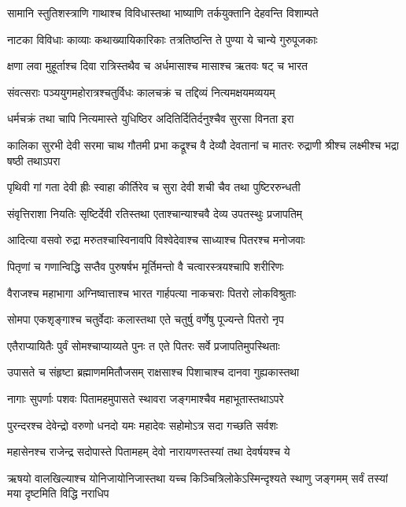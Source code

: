 \twolineshloka
{सामानि स्तुतिशस्त्राणि गाथाश्च विविधास्तथा}
{भाष्याणि तर्कयुक्तानि देहवन्ति विशाम्पते}


\twolineshloka
{नाटका विविधाः काव्याः कथाख्यायिकारिकाः}
{तत्रतिष्ठन्ति ते पुण्या ये चान्ये गुरुपूजकाः}


\twolineshloka
{क्षणा लवा मुहूर्ताश्च दिवा रात्रिस्तथैव च}
{अर्धमासाश्च मासाश्च ऋतवः षट् च भारत}


\twolineshloka
{संवत्सराः पञ्ययुगमहोरात्रश्चतुर्विधः}
{कालचक्रं च तद्दिव्यं नित्यमक्षयमव्ययम्}


\twolineshloka
{धर्मचक्रं तथा चापि नित्यमास्ते युधिष्ठिर}
{अदितिर्दितिर्दनुश्चैव सुरसा विनता इरा}


कालिका सुरभी देवी सरमा चाथ गौतमी
\twolineshloka
{प्रभा कद्रूश्च वै देव्यौ देवतानां च मातरः}
{रुद्राणी श्रीश्च लक्ष्मीश्च भद्रा षष्ठी तथाऽपरा}


\twolineshloka
{पृथिवी गां गता देवी ह्रीः स्वाहा कीर्तिरेव च}
{सुरा देवी शची चैव तथा पुष्टिररुन्धती}


\twolineshloka
{संवृत्तिराशा नियतिः सृष्टिर्देवी रतिस्तथा}
{एताश्चान्याश्चवै देव्य उपतस्थुः प्रजापतिम्}


\twolineshloka
{आदित्या वसवो रुद्रा मरुतश्चास्विनावपि}
{विश्वेदेवाश्च साध्याश्च पितरश्च मनोजवाः}


\twolineshloka
{पितृणां च गणान्विद्धि सप्तैव पुरुषर्षभ}
{मूर्तिमन्तो वै चत्वारस्त्रयश्चापि शरीरिणः}


\twolineshloka
{वैराजश्च महाभागा अग्निष्वात्ताश्च भारत}
{गार्हपत्या नाकचराः पितरो लोकविश्रुताः}


\twolineshloka
{सोमपा एकशृङ्गाश्च चतुर्वेदाः कलास्तथा}
{एते चतुर्षु वर्णेषु पूज्यन्ते पितरो नृप}


\twolineshloka
{एतैराप्यायितैः पुर्वं सोमश्चाप्याय्यते पुनः}
{त एते पितरः सर्वे प्रजापतिमुपस्थिताः}


\twolineshloka
{उपासते च संहृष्टा ब्रह्माणममितौजसम्}
{राक्षसाश्च पिशाचाश्च दानवा गुह्यकास्तथा}


\twolineshloka
{नागाः सुपर्णाः पशवः पितामहमुपासते}
{स्थावरा जङ्गमाश्चैव महाभूतास्तथाऽपरे}


\twolineshloka
{पुरन्दरश्च देवेन्द्रो वरुणो धनदो यमः}
{महादेवः सहोमोऽत्र सदा गच्छति सर्वशः}


\twolineshloka
{महासेनश्च राजेन्द्र सदोपास्ते पितामहम्}
{देवो नारायणस्तस्यां तथा देवर्षयश्च ये}


\threelineshloka
{ऋषयो वालखिल्याश्च योनिजायोनिजास्तथा}
{यच्च किञ्चित्रिलोकेऽस्मिन्दृश्यते स्थाणु जङ्गमम्}
{सर्वं तस्यां मया दृष्टमिति विद्धि नराधिप}


